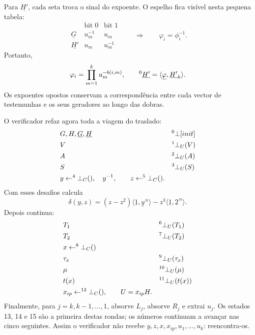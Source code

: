 Para \(\underline{H'}\), cada seta troca o sinal do expoente. O espelho fica
visível nesta pequena tabela:
\[
\begin{array}{c|cc}
 &\text{bit }0&\text{bit }1\\ \hline
\underline G&u_m^{-1}&u_m\\
\underline{H'}&u_m&u_m^{-1}
\end{array}
\qquad\Longrightarrow\qquad
\varphi_i=\phi_i^{-1}.
\]
Portanto,
\[
 \varphi_i=\prod_{m=1}^{k}u_m^{-b(i,m)},\qquad
 ^{0}_{\ }\underline{H'}
 =\langle\underline\varphi,\underline{H'}_k\rangle.
\]
Os expoentes opostos conservam a correspondência entre cada vector de
testemunhas e os seus geradores ao longo das dobras.

O verificador refaz agora toda a viagem do traslado:
\begin{align*}
&G,H,\underline G,\underline H
 &&\hspace*{\fill}\ce{^{0}_{\ }\bot[init]}\\
&V&&\hspace*{\fill}\ce{^{1}_{\ }\bot_U(V)}\\
&A&&\hspace*{\fill}\ce{^{2}_{\ }\bot_U(A)}\\
&S&&\hspace*{\fill}\ce{^{3}_{\ }\bot_U(S)}\\
&y\leftarrow\ce{^{4}_{\ }\bot_C()},\quad
 y^{-1},\qquad
 z\leftarrow\ce{^{5}_{\ }\bot_C()} .
\end{align*}
Com esses desafios calcula
\[
 \delta(y,z)=(z-z^2)\langle\underline1,\underline y^{\,n}\rangle
 -z^3\langle\underline1,\underline2^{\,n}\rangle.
\]
Depois continua:
\begin{align*}
&T_1&&\hspace*{\fill}\ce{^{6}_{\ }\bot_U(T_1)}\\
&T_2&&\hspace*{\fill}\ce{^{7}_{\ }\bot_U(T_2)}\\
&x\leftarrow\ce{^{8}_{\ }\bot_C()}\\
&\tau_x&&\hspace*{\fill}\ce{^{9}_{\ }\bot_U(\tau_x)}\\
&\mu&&\hspace*{\fill}\ce{^{10}_{\ }\bot_U(\mu)}\\
&t(x)&&\hspace*{\fill}\ce{^{11}_{\ }\bot_U(t(x))}\\
&x_{ip}\leftarrow\ce{^{12}_{\ }\bot_C()},\qquad U=x_{ip}H.
\end{align*}
Finalmente, para \(j=k,k-1,\ldots,1\), absorve \(L_j\), absorve \(R_j\) e
extrai \(u_j\). Os estados 13, 14 e 15 são a primeira destas rondas; os números
continuam a avançar nas cinco seguintes. Assim o verificador não recebe
\(y,z,x,x_{ip},u_1,\ldots,u_k\): reencontra-os.

